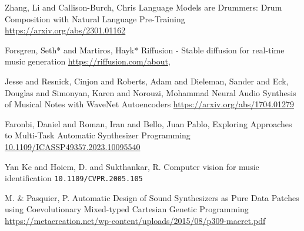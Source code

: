 \documentclass[]{beamer}
\begin{document}
\begin{frame}
  \begin{thebibliography}{99} %

   Zhang, Li and Callison-Burch, Chris
  \newblock Language Models are Drummers: Drum Composition with Natural Language Pre-Training
  \newblock \url{https://arxiv.org/abs/2301.01162}

   Forsgren, Seth* and Martiros, Hayk*
  \newblock Riffusion - Stable diffusion for real-time music generation
  \newblock \url{https://riffusion.com/about},

   Jesse and Resnick, Cinjon and Roberts, Adam and Dieleman, Sander and Eck, Douglas and Simonyan, Karen and Norouzi, Mohammad
  \newblock Neural Audio Synthesis of Musical Notes with WaveNet Autoencoders
  \newblock \url{https://arxiv.org/abs/1704.01279}

  \end{thebibliography}
\end{frame}

\begin{frame}
  \begin{thebibliography}{99} %
   Faronbi, Daniel and Roman, Iran and Bello, Juan Pablo,
  \newblock Exploring Approaches to Multi-Task Automatic Synthesizer Programming
  \newblock \url{10.1109/ICASSP49357.2023.10095540}

   Yan Ke and Hoiem, D. and Sukthankar, R.
  \newblock Computer vision for music identification
  \newblock \texttt{10.1109/CVPR.2005.105}

   M. & Pasquier, P.
  \newblock Automatic Design of Sound Synthesizers as Pure Data Patches using Coevolutionary Mixed-typed Cartesian Genetic Programming
  \newblock \url{https://metacreation.net/wp-content/uploads/2015/08/p309-macret.pdf}

  \end{thebibliography}
\end{frame}
\end{document}
